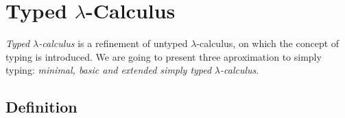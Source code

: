 







\section{Typed $\lambda$-Calculus}
\emph{Typed $\lambda$-calculus} is a refinement of untyped $\lambda$-calculus, on which the concept of typing is introduced. We are going to present three aproximation to simply typing: \emph{minimal, basic and extended simply typed }$\lambda$\emph{-calculus}. 

\subsection{Definition}

